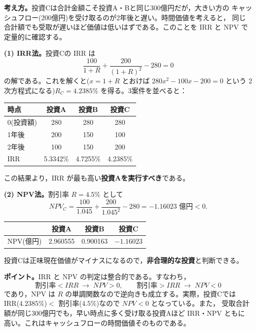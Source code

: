 \begin{answerbox}
\textbf{考え方。}投資Cは合計金額こそ投資A・Bと同じ300億円だが，大きい方の
キャッシュフロー(200億円)を受け取るのが2年後と遅い。時間価値を考えると，
同じ合計額でも受取が遅いほど価値は低いはずである。このことを IRR と NPV で
定量的に確認する。

\medskip
\textbf{(1) IRR法。}投資Cの IRR は
\[
\frac{100}{1+R} + \frac{200}{(1+R)^2} - 280 = 0
\]
の解である。これを解くと($x=1+R$ とおけば $280x^2 - 100x - 200 = 0$ という
2次方程式になる)$R_C = 4.2385\%$ を得る。3案件を並べると：
\vspace{0.9em}
\begin{center}
\begin{tabular}{lccc}
\toprule
時点 & 投資A & 投資B & 投資C\\
\midrule
0(投資額) & 280 & 280 & 280\\
1年後 & 200 & 150 & 100\\
2年後 & 100 & 150 & 200\\
\midrule
IRR & 5.3342\% & 4.7255\% & 4.2385\%\\
\bottomrule
\end{tabular}
\end{center}
\vspace{0.9em}
この結果より，IRR が最も高い\textbf{投資Aを実行すべき}である。

\medskip
\textbf{(2) NPV法。}割引率 $R=4.5\%$ として
\[
NPV_C = \frac{100}{1.045} + \frac{200}{1.045^2} - 280 = -1.16023\text{ 億円} < 0.
\]
\vspace{0.9em}
\begin{center}
\begin{tabular}{lccc}
\toprule
 & 投資A & 投資B & 投資C\\
\midrule
NPV(億円) & 2.960555 & 0.900163 & $-1.16023$\\
\bottomrule
\end{tabular}
\end{center}
\vspace{0.9em}
投資Cは正味現在価値がマイナスになるので，\textbf{非合理的な投資}と判断できる。

\medskip
\textbf{ポイント。}IRR と NPV の判定は整合的である。すなわち，
\[
\text{割引率} < IRR \;\to\; NPV > 0,
\qquad
\text{割引率} > IRR \;\to\; NPV < 0
\]
であり，NPV は $R$ の単調関数なので逆向きも成立する。実際，投資Cでは
IRR($4.2385\%$)$<$ 割引率($4.5\%$)なので $NPV<0$ となっている。また，
受取合計額が同じ300億円でも，早い時点に多く受け取る投資Aほど IRR・NPV ともに
高い。これはキャッシュフローの時間価値そのものである。
\end{answerbox}

